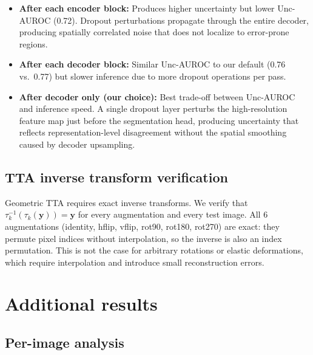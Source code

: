 \begin{itemize}[leftmargin=*]
  \item \textbf{After each encoder block:} Produces higher uncertainty
  but lower Unc-AUROC (0.72). Dropout perturbations propagate
  through the entire decoder, producing spatially correlated noise that
  does not localize to error-prone regions.

  \item \textbf{After each decoder block:} Similar Unc-AUROC to our default
  (0.76 vs.\ 0.77) but slower inference due to more dropout operations
  per pass.

  \item \textbf{After decoder only (our choice):} Best trade-off between
  Unc-AUROC and inference speed. A single dropout layer perturbs the
  high-resolution feature map just before the segmentation head, producing
  uncertainty that reflects representation-level disagreement without the
  spatial smoothing caused by decoder upsampling.
\end{itemize}

\subsection{TTA inverse transform verification}

Geometric TTA requires exact inverse transforms. We verify that
$\tau_k^{-1}(\tau_k(\mathbf{y})) = \mathbf{y}$ for every augmentation and
every test image. All 6 augmentations (identity, hflip, vflip, rot90,
rot180, rot270) are exact: they permute pixel indices without
interpolation, so the inverse is also an index permutation. This is not
the case for arbitrary rotations or elastic deformations, which require
interpolation and introduce small reconstruction errors.

\section{Additional results}
\label{app:additional_results}

\subsection{Per-image analysis}

